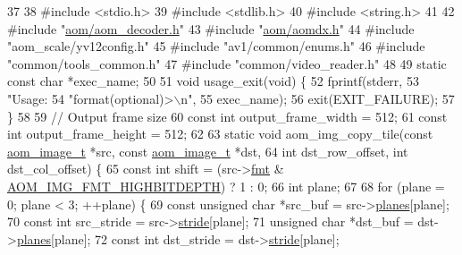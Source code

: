 \begin{DoxyCodeInclude}
37 
38 \textcolor{preprocessor}{#include <stdio.h>}
39 \textcolor{preprocessor}{#include <stdlib.h>}
40 \textcolor{preprocessor}{#include <string.h>}
41 
42 \textcolor{preprocessor}{#include "\hyperlink{aom__decoder_8h}{aom/aom\_decoder.h}"}
43 \textcolor{preprocessor}{#include "\hyperlink{aomdx_8h}{aom/aomdx.h}"}
44 \textcolor{preprocessor}{#include "aom\_scale/yv12config.h"}
45 \textcolor{preprocessor}{#include "av1/common/enums.h"}
46 \textcolor{preprocessor}{#include "common/tools\_common.h"}
47 \textcolor{preprocessor}{#include "common/video\_reader.h"}
48 
49 \textcolor{keyword}{static} \textcolor{keyword}{const} \textcolor{keywordtype}{char} *exec\_name;
50 
51 \textcolor{keywordtype}{void} usage\_exit(\textcolor{keywordtype}{void}) \{
52   fprintf(stderr,
53           \textcolor{stringliteral}{"Usage: %
54           \textcolor{stringliteral}{"format(optional)>\(\backslash\)n"},
55           exec\_name);
56   exit(EXIT\_FAILURE);
57 \}
58 
59 \textcolor{comment}{// Output frame size}
60 \textcolor{keyword}{const} \textcolor{keywordtype}{int} output\_frame\_width = 512;
61 \textcolor{keyword}{const} \textcolor{keywordtype}{int} output\_frame\_height = 512;
62 
63 \textcolor{keyword}{static} \textcolor{keywordtype}{void} aom\_img\_copy\_tile(\textcolor{keyword}{const} \hyperlink{structaom__image}{aom\_image\_t} *src, \textcolor{keyword}{const} 
      \hyperlink{structaom__image}{aom\_image\_t} *dst,
64                               \textcolor{keywordtype}{int} dst\_row\_offset, \textcolor{keywordtype}{int} dst\_col\_offset) \{
65   \textcolor{keyword}{const} \textcolor{keywordtype}{int} shift = (src->\hyperlink{structaom__image_a6c64b1ab918d80d52eb8f5d6d957e825}{fmt} & \hyperlink{aom__image_8h_a607b37d91f75442f54223ecd85f1b6cb}{AOM\_IMG\_FMT\_HIGHBITDEPTH}) ? 1 : 0;
66   \textcolor{keywordtype}{int} plane;
67 
68   \textcolor{keywordflow}{for} (plane = 0; plane < 3; ++plane) \{
69     \textcolor{keyword}{const} \textcolor{keywordtype}{unsigned} \textcolor{keywordtype}{char} *src\_buf = src->\hyperlink{structaom__image_ac54dbc5237ca2914f9ec30105dfbe302}{planes}[plane];
70     \textcolor{keyword}{const} \textcolor{keywordtype}{int} src\_stride = src->\hyperlink{structaom__image_a6dc693d7dbc9eb06c0cdde307ca58372}{stride}[plane];
71     \textcolor{keywordtype}{unsigned} \textcolor{keywordtype}{char} *dst\_buf = dst->\hyperlink{structaom__image_ac54dbc5237ca2914f9ec30105dfbe302}{planes}[plane];
72     \textcolor{keyword}{const} \textcolor{keywordtype}{int} dst\_stride = dst->\hyperlink{structaom__image_a6dc693d7dbc9eb06c0cdde307ca58372}{stride}[plane];
}
\end{DoxyCodeInclude}
